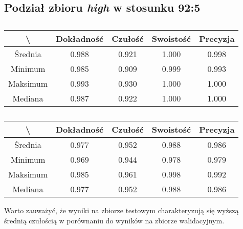 \subsection{Podział zbioru \textit{high} w stosunku 92:5}
\label{sec:highsplita}


\begin{table}[H]
	\centering
	\caption{}
	\vspace{6pt}
	{\footnotesize
		\begin{tabular}{|c|c|c|c|c|}
      \hline \textbackslash & Dokładność & Czułość & Swoistość & Precyzja \\
      \hline Średnia & 0.988 & 0.921 & 1.000 & 0.998 \\
      \hline Minimum & 0.985 & 0.909 & 0.999 & 0.993 \\
      \hline Maksimum & 0.993 & 0.930 & 1.000 & 1.000 \\
      \hline Mediana & 0.987 & 0.922 & 1.000 & 1.000 \\
      \hline
    \end{tabular}
    \label{Tab:highsplita_val}
	}
	\vspace{0pt}
\end{table}

\begin{table}[H]
	\centering
	\caption{}
	\vspace{6pt}
	{\footnotesize
		\begin{tabular}{|c|c|c|c|c|}
      \hline \textbackslash & Dokładność & Czułość & Swoistość & Precyzja \\
      \hline Średnia & 0.977 & 0.952 & 0.988 & 0.986 \\
      \hline Minimum & 0.969 & 0.944 & 0.978 & 0.979 \\
      \hline Maksimum & 0.985 & 0.961 & 0.998 & 0.992 \\
      \hline Mediana & 0.977 & 0.952 & 0.988 & 0.986 \\
      \hline
    \end{tabular}
    \label{Tab:highsplita_test}
	}
	\vspace{0pt}
\end{table}

Warto zauważyć, że wyniki na zbiorze testowym charakteryzują się wyższą średnią czułością w porównaniu do wyników na zbiorze walidacyjnym.
